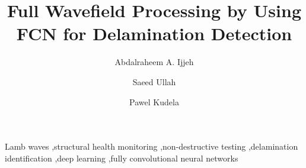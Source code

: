 \documentclass[preprint,9pt]{elsarticle}
\begin{document}
	\begin{frontmatter}
		
		\title{Full Wavefield Processing by Using FCN for Delamination Detection}
		
		\address[IFFM]{Institute of Fluid Flow Machinery, Polish Academy of Sciences, Poland}
		
		\author{Abdalraheem A. Ijjeh}
		\author{Saeed Ullah }
		\author{Pawel Kudela}
		
		
		\begin{abstract}
		
		\end{abstract}
		
		\begin{keyword}
			Lamb waves \sep structural health monitoring \sep non-destructive testing \sep delamination identification \sep deep learning \sep  fully convolutional neural networks 
			
			
		\end{keyword}
		
	\end{frontmatter}

\end{document}
